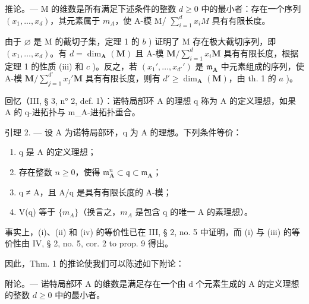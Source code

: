 推论。--- M 的维数是所有满足下述条件的整数 \(d \geqslant 0\) 中的最小者：存在一个序列 \((x_{1}, ..., x_{d})\)，其元素属于 \(m_{A}\)，使 A-模 M/ \(\sum_{i=1}^{d} x_{i}M\) 具有有限长度。

由于 \(\varnothing\) 是 M 的截切子集，定理 1 的 \(b\) ) 证明了 M 存在极大截切序列，即 \((x_{1},\ldots,x_{d})\)。有 \(d=\dim_{\mathbf{A}}(\mathbf{M})\) 且 A-模 \(\mathbf{M}/\sum_{i=1}^{d}x_{i}\mathbf{M}\) 具有有限长度，根据定理 1 的性质 (iii) 和 \(c\) )。反之，若 \((x_{1}',\ldots,x_{d'}')\) 是 \(\mathfrak{m}_{\mathbf{A}}\) 中元素组成的序列，使 A-模 \(\mathbf{M}/\sum_{j=1}^{d'}x_{j}'\mathbf{M}\) 具有有限长度，则有 \(d'\geqslant\dim_{\mathbf{A}}(\mathbf{M})\)，由 th. 1 的 \(a\) )。

回忆（III, § 3, n° 2, def. 1）：诺特局部环 A 的理想 q 称为 A 的定义理想，如果 A 的 q-进拓扑与 m\_A-进拓扑重合。

引理 2. --- 设 A 为诺特局部环，q 为 A 的理想。下列条件等价：

\begin{enumerate}
\def\labelenumi{(\roman{enumi})}
\item
  q 是 A 的定义理想；
\item
  存在整数 \(n \geqslant 0\)，使得 \(\mathfrak{m}_{\mathbf{A}}^{n} \subset \mathfrak{q} \subset \mathfrak{m}_{\mathbf{A}}\)；
\item
  q ≠ A，且 A/q 是具有有限长度的 A-模；
\item
  V(q) 等于 \(\{m_{A}\}\)（换言之，\(m_{A}\) 是包含 q 的唯一 A 的素理想）。
\end{enumerate}

事实上，(i)、(ii) 和 (iv) 的等价性已在 III, § 2, no. 5 中证明，而 (i) 与 (iii) 的等价性由 IV, § 2, no. 5, cor. 2 to prop. 9 得出。

因此，Thm. 1 的推论使我们可以陈述如下附论：

附论。--- 诺特局部环 A 的维数是满足存在一个由 d 个元素生成的 A 的定义理想的整数 \(d \geqslant 0\) 中的最小者。

